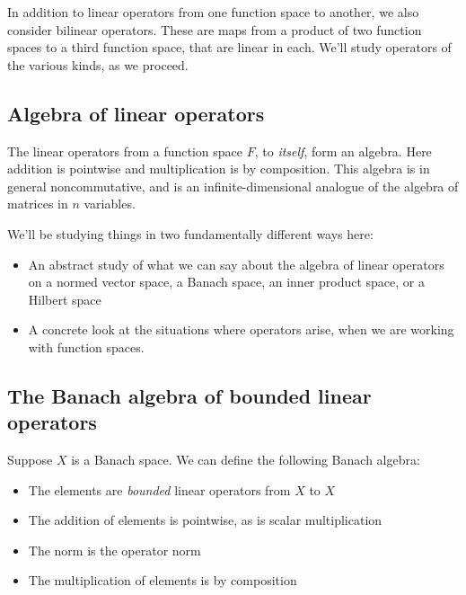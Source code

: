 \documentclass[a4paper]{amsart}
\begin{document}
In addition to linear operators from one function space to another, we
also consider bilinear operators. These are maps from a product of two
function spaces to a third function space, that are linear in
each. We'll study operators of the various kinds, as we proceed.

\subsection{Algebra of linear operators}

The linear operators from a function space $F$, to {\em itself}, form
an algebra. Here addition is pointwise and multiplication is by
composition.  This algebra is in general noncommutative, and is an
infinite-dimensional analogue of the algebra of matrices in $n$
variables.

We'll be studying things in two fundamentally different ways here:

\begin{itemize}

\item An abstract study of what we can say about the algebra of linear
  operators on a normed vector space, a Banach space, an inner product
  space, or a Hilbert space

\item A concrete look at the situations where operators arise, when we
  are working with function spaces.

\end{itemize}

\subsection{The Banach algebra of bounded linear operators}

Suppose $X$ is a Banach space. We can define the following Banach algebra:

\begin{itemize}

\item The elements are {\em bounded} linear operators from $X$ to $X$

\item The addition of elements is pointwise, as is scalar multiplication

\item The norm is the operator norm

\item The multiplication of elements is by composition

\end{itemize}
\end{document}

